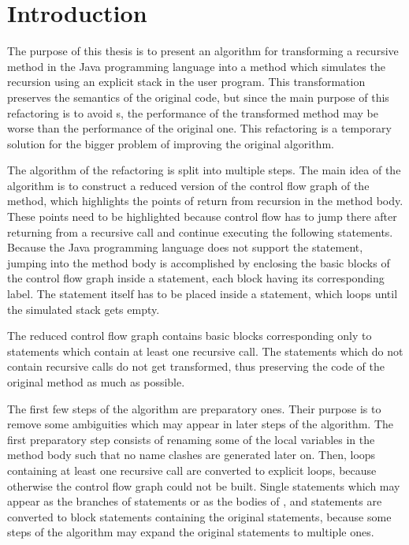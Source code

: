 \chapter{Introduction}

The purpose of this thesis is to present an algorithm for transforming a recursive method in the Java programming
language into a method which simulates the recursion using an explicit stack in the user program. This transformation
preserves the semantics of the original code, but since the main purpose of this refactoring is to avoid
s, the performance of the transformed method may be worse than the performance of the original
one. This refactoring is a temporary solution for the bigger problem of improving the original algorithm.

The algorithm of the refactoring is split into multiple steps. The main idea of the algorithm is to construct a reduced
version of the control flow graph of the method, which highlights the points of return from recursion in the method
body. These points need to be highlighted because control flow has to jump there after returning from a recursive call
and continue executing the following statements. Because the Java programming language does not support the 
statement, jumping into the method body is accomplished by enclosing the basic blocks of the control flow graph inside
a  statement, each block having its corresponding  label. The  statement itself
has to be placed inside a  statement, which loops until the simulated stack gets empty.

The reduced control flow graph contains basic blocks corresponding only to statements which contain at least one
recursive call. The statements which do not contain recursive calls do not get transformed, thus preserving the code of
the original method as much as possible.

The first few steps of the algorithm are preparatory ones. Their purpose is to remove some ambiguities which may appear
in later steps of the algorithm. The first preparatory step consists of renaming some of the local variables in the
method body such that no name clashes are generated later on. Then,  loops containing at least one
recursive call are converted to explicit  loops, because otherwise the control flow graph could not be built.
Single statements which may appear as the branches of  statements or as the bodies of , 
and  statements are converted to block statements containing the original statements, because some steps
of the algorithm may expand the original statements to multiple ones.

